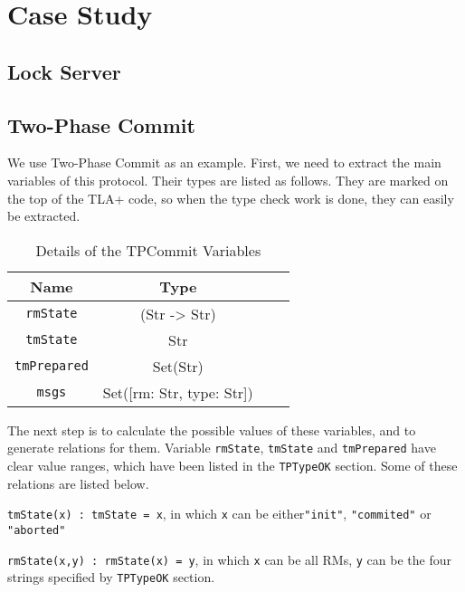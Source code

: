 
\section{Case Study}  \label{section:case-study}

\subsection{Lock Server} \label{ss:lock-server}

\subsection{Two-Phase Commit} \label{ss:2pc}

We use Two-Phase Commit as an example. First, we need to extract the main variables of this protocol. Their types are listed as follows. They are marked on the top of the TLA+ code, so when the type check work is done, they can easily be extracted. 

\begin{table} \label{tp-type}
	\caption{Details of the TPCommit Variables}
	\label{tab:freq}
	\begin{tabular}{cccc}
		\toprule
		Name&Type\\
		\midrule
		{\texttt{rmState}} & (Str -> Str)\\
		{\texttt{tmState}} & Str\\
		{\texttt{tmPrepared}} & Set(Str)\\
		{\texttt{msgs}} & Set([rm: Str, type: Str])\\
		\bottomrule
	\end{tabular}
\end{table}

The next step is to calculate the possible values of these variables, and to generate relations for them. Variable {\texttt{rmState}}, {\texttt{tmState}} and {\texttt{tmPrepared}} have clear value ranges, which have been listed in the {\texttt{TPTypeOK}} section. Some of these relations are listed below.

{\texttt{tmState(x) : tmState = x}}, in which {\texttt{x}} can be either{\texttt{"init"}}, {\texttt{"commited"}} or {\texttt{"aborted"}}

{\texttt{rmState(x,y) : rmState(x) = y}}, in which {\texttt{x}} can be all RMs, {\texttt{y}} can be the four strings specified by {\texttt{TPTypeOK}} section.

